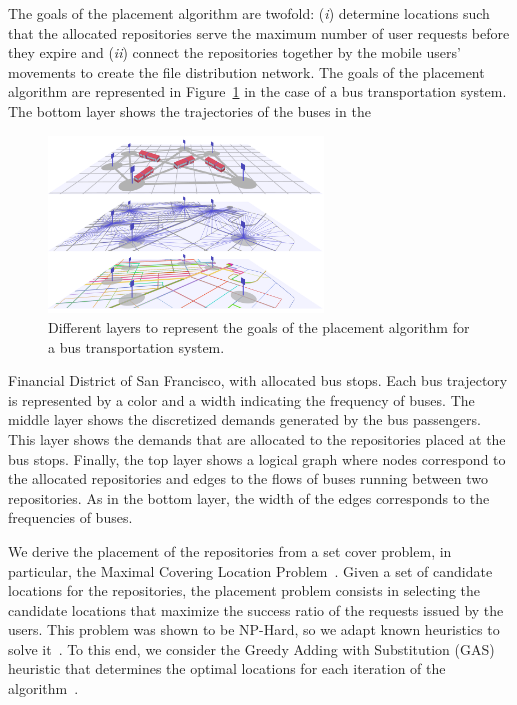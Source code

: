 The goals of the placement algorithm are twofold: (\textit{i}) determine locations such that the allocated repositories serve the maximum number of user requests before they expire and (\textit{ii}) connect the repositories together by the mobile users' movements to create the file distribution network. The goals of the placement algorithm are represented in Figure~\ref{fig:placement-alg} in the case of a bus transportation system. The bottom layer shows the trajectories of the buses in the  
\begin{figure}
    \vspace{-7pt}
    \centering
    \includegraphics[width=7.3cm]{figures/bus-distribution-system.pdf}
    \caption{Different layers to represent the goals of the placement algorithm for a bus transportation system.}
    \label{fig:placement-alg}
\end{figure}
Financial District of San Francisco, with allocated bus stops. Each bus trajectory is represented by a color and a width indicating the frequency of buses. The middle layer shows the discretized demands generated by the bus passengers. This layer shows the demands that are allocated to the repositories placed at the bus stops. Finally, the top layer shows a logical graph where nodes correspond to the allocated repositories and edges to the flows of buses running between two repositories. As in the bottom layer, the width of the edges corresponds to the frequencies of buses. 

We derive the placement of the repositories from a set cover problem, in particular, the Maximal Covering Location Problem~\cite{church1974maximal}. Given a set of candidate locations for the repositories, the placement problem consists in selecting the candidate locations that maximize the success ratio of the requests issued by the users. This problem was shown to be NP-Hard, so we adapt known heuristics to solve it~\cite{megiddo1983maximum}. To this end, we consider the Greedy Adding with Substitution (GAS) heuristic that determines the optimal locations for each iteration of the algorithm~\cite{church1974maximal}. 


